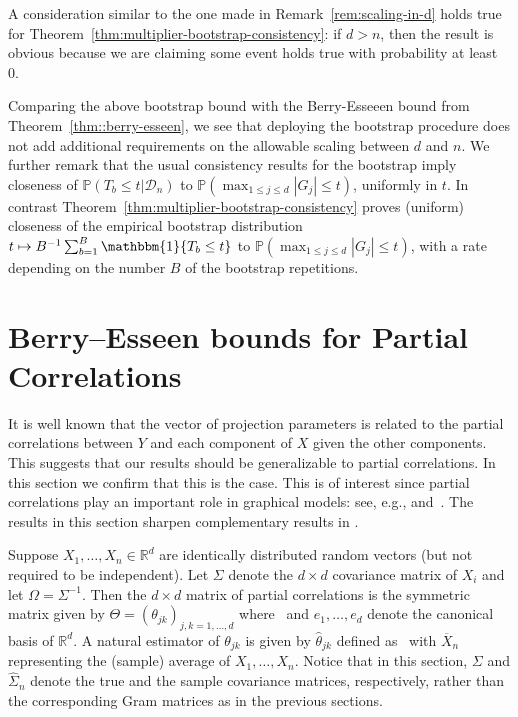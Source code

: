 \documentclass{article}
\begin{document}
 A consideration similar to the one made in Remark~\ref{rem:scaling-in-d} holds true for Theorem~\ref{thm:multiplier-bootstrap-consistency}: if  $d>n$, then the result is obvious because we are claiming some event holds true with probability at least 0.
 
 Comparing the above bootstrap bound with the Berry-Esseeen bound from Theorem~\ref{thm::berry-esseen}, we see that deploying the bootstrap procedure does not add additional requirements on the allowable scaling between $d$ and $n$.
 We further remark that the usual consistency results for the bootstrap imply closeness of $\mathbb{P}(T_b \le t\big|\mathcal{D}_n)$ to $\mathbb{P}(\max_{1\le j\le d}|G_j| \le t)$, uniformly in $t$. In contrast Theorem~\ref{thm:multiplier-bootstrap-consistency} proves (uniform) closeness of the empirical bootstrap distribution $t\mapsto B^{-1}\sum_{b=1}^B \mathbbm{1}\{T_b \le t\}$ to $\mathbb{P}(\max_{1\le j\le d}|G_j| \le t)$, with a rate depending on the number $B$ of the bootstrap repetitions.
 
 
 
 \section{Berry--Esseen bounds for Partial Correlations}
 \label{section::partial}
 
 
 It is well known that the vector of projection parameters is related to the
 partial correlations between $Y$ and each component of $X$ given
 the other components.
 This suggests that our results should be generalizable to
 partial correlations.
 In this section we confirm that this is the case.
 This is of interest since partial correlations
 play an important role in graphical models: see, e.g., \cite{Lau96} and~\cite{drton2004model}. The results in this section sharpen complementary results in \cite{wasserman2014berry}. 
 
 
 Suppose $X_1, \ldots, X_n\in\mathbb{R}^d$ are identically distributed random vectors (but not required to be independent). Let $\Sigma$ denote the $d\times d$ covariance matrix of $X_i$ and let $\Omega = \Sigma^{-1}.$ Then the $d \times d$ matrix of partial correlations is the symmetric matrix given by $\Theta = (\theta_{jk})_{j,k=1,\ldots,d}$ where
 \
 and $e_1, \ldots, e_d$ denote the canonical basis of $\mathbb{R}^d$. A natural estimator of $\theta_{jk}$ is given by $\widehat{\theta}_{jk}$ defined as
 \
 with $\overline{X}_n$ representing the (sample) average of $X_1, \ldots, X_n$. Notice that in this section, $\Sigma$ and $\widehat{\Sigma}_n$ denote the true and the sample covariance matrices, respectively,  rather than the corresponding Gram matrices as in the previous sections.
 
\end{document}
